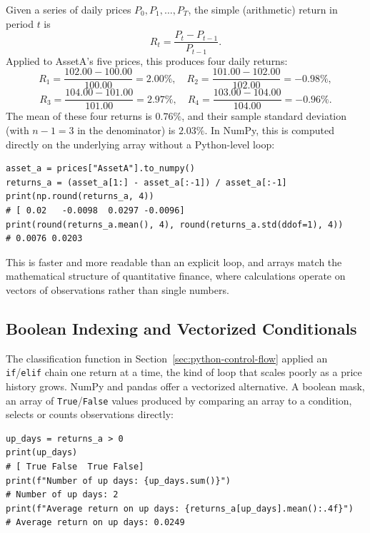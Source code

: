 \documentclass[../ai_in_finance]{subfiles}
\begin{document}
Given a series of daily prices $P_0, P_1, \dots, P_T$, the simple (arithmetic) return in period $t$ is
\begin{equation}
R_t = \frac{P_t - P_{t-1}}{P_{t-1}}.\label{eq:python-simple-return}
\end{equation}
Applied to AssetA's five prices, this produces four daily returns:
\begin{equation*}
R_1 = \frac{102.00 - 100.00}{100.00} = 2.00\%, \quad
R_2 = \frac{101.00 - 102.00}{102.00} = -0.98\%,
\end{equation*}
\begin{equation*}
R_3 = \frac{104.00 - 101.00}{101.00} = 2.97\%, \quad
R_4 = \frac{103.00 - 104.00}{104.00} = -0.96\%.
\end{equation*}
The mean of these four returns is $0.76\%$, and their sample standard deviation (with $n-1=3$ in the denominator) is $2.03\%$. In NumPy, this is computed directly on the underlying array without a Python-level loop:

\begin{verbatim}
asset_a = prices["AssetA"].to_numpy()
returns_a = (asset_a[1:] - asset_a[:-1]) / asset_a[:-1]
print(np.round(returns_a, 4))
# [ 0.02   -0.0098  0.0297 -0.0096]
print(round(returns_a.mean(), 4), round(returns_a.std(ddof=1), 4))
# 0.0076 0.0203
\end{verbatim}

This is faster and more readable than an explicit loop, and arrays match the mathematical structure of quantitative finance, where calculations operate on vectors of observations rather than single numbers.

\subsection{Boolean Indexing and Vectorized Conditionals}
\label{sec:python-boolean-indexing}

The classification function in Section~\ref{sec:python-control-flow} applied an \texttt{if}/\texttt{elif} chain one return at a time, the kind of loop that scales poorly as a price history grows. NumPy and pandas offer a vectorized alternative. A boolean mask, an array of \texttt{True}/\texttt{False} values produced by comparing an array to a condition, selects or counts observations directly:

\begin{verbatim}
up_days = returns_a > 0
print(up_days)
# [ True False  True False]
print(f"Number of up days: {up_days.sum()}")
# Number of up days: 2
print(f"Average return on up days: {returns_a[up_days].mean():.4f}")
# Average return on up days: 0.0249
\end{verbatim}
\end{document}
